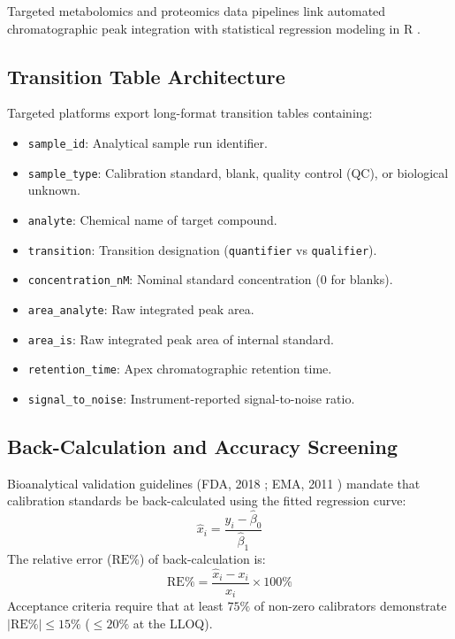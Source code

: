 \documentclass[11pt,twoside,openright]{book}
\begin{document}
Targeted metabolomics and proteomics data pipelines link automated chromatographic peak integration with statistical regression modeling in R \cite{maclean2010skyline, choi2014msstats, liebler2013targeted, huber2015orchestrating, gatto2023qfeatures}.

\subsection{Transition Table Architecture}
Targeted platforms export long-format transition tables containing:
\begin{itemize}
    \item \texttt{sample\_id}: Analytical sample run identifier.
    \item \texttt{sample\_type}: Calibration standard, blank, quality control (QC), or biological unknown.
    \item \texttt{analyte}: Chemical name of target compound.
    \item \texttt{transition}: Transition designation (\texttt{quantifier} vs \texttt{qualifier}).
    \item \texttt{concentration\_nM}: Nominal standard concentration ($0$ for blanks).
    \item \texttt{area\_analyte}: Raw integrated peak area.
    \item \texttt{area\_is}: Raw integrated peak area of internal standard.
    \item \texttt{retention\_time}: Apex chromatographic retention time.
    \item \texttt{signal\_to\_noise}: Instrument-reported signal-to-noise ratio.
\end{itemize}

\subsection{Back-Calculation and Accuracy Screening}
Bioanalytical validation guidelines (FDA, 2018 \cite{fda2018bioanalytical}; EMA, 2011 \cite{ema2011guideline}) mandate that calibration standards be back-calculated using the fitted regression curve:
\begin{equation}
\hat{x}_i = \frac{y_i - \hat{\beta}_0}{\hat{\beta}_1}
\label{eq:back_calc}
\end{equation}
The relative error ($\text{RE}\%$) of back-calculation is:
\begin{equation}
\text{RE}\% = \frac{\hat{x}_i - x_i}{x_i} \times 100\%
\label{eq:relative_error}
\end{equation}
Acceptance criteria require that at least $75\%$ of non-zero calibrators demonstrate $|\text{RE}\%| \le 15\%$ ($\le 20\%$ at the LLOQ).
\end{document}
